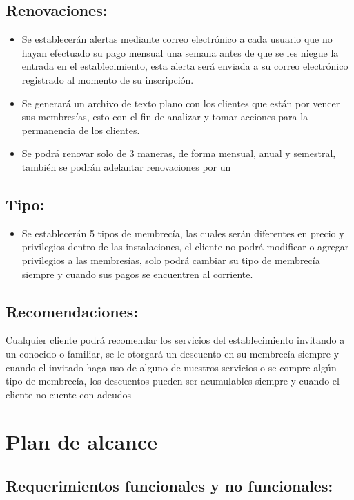 \documentclass[12pt,letterpaper]{article}
\begin{document}
    \subsection*{Renovaciones:}
        \begin{itemize}
            \item Se establecerán alertas mediante correo electrónico a cada usuario que no hayan efectuado su pago mensual una semana antes de que se les niegue la entrada en el establecimiento, esta alerta será enviada a su correo electrónico registrado al momento de su inscripción.
            \item Se generará un archivo de texto plano con los clientes que están por vencer sus membresías, esto con el fin de analizar y tomar acciones para la permanencia de los clientes.
            \item Se podrá renovar solo de 3 maneras, de forma mensual, anual y semestral, también se podrán adelantar renovaciones por un 
        \end{itemize}
    \subsection*{Tipo:}
        \begin{itemize}
            \item Se establecerán 5 tipos de membrecía, las cuales serán diferentes en precio y privilegios dentro de las instalaciones, el cliente no podrá modificar o agregar privilegios a las membresías, solo podrá cambiar su tipo de membrecía siempre y cuando sus pagos se encuentren al corriente.
        \end{itemize}
    \subsection*{Recomendaciones:}
        Cualquier cliente podrá recomendar los servicios del establecimiento invitando a un conocido o familiar, se le otorgará un descuento en su membrecía siempre y cuando el invitado haga uso de alguno de nuestros servicios o se compre algún tipo de membrecía, los descuentos pueden ser acumulables siempre y cuando el cliente no cuente con adeudos

			
\section{Plan de alcance}
\subsection{Requerimientos funcionales y no funcionales:}
\end{document}
